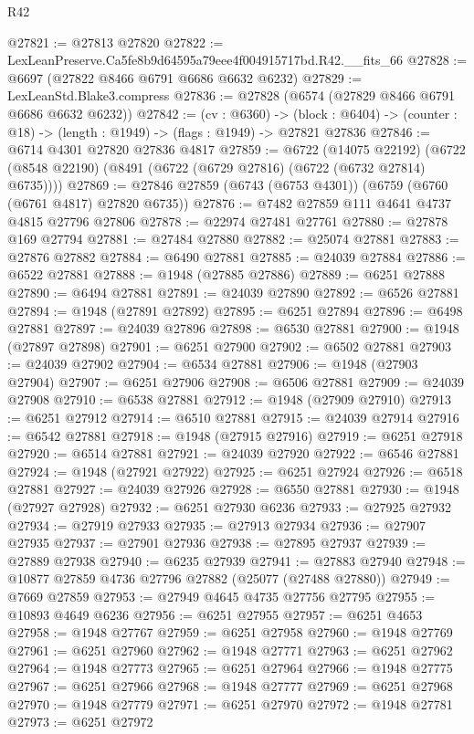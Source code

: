 \begin{lexlean}{R42}
\begin{coremodule}
{@27821 := @27813 @27820
@27822 := LexLeanPreserve.Ca5fe8b9d64595a79eee4f004915717bd.R42.__fits_66
@27828 := @6697 (@27822 @8466 @6791 @6686 @6632 @6232)
@27829 := LexLeanStd.Blake3.compress
@27836 := @27828 (@6574 (@27829 @8466 @6791 @6686 @6632 @6232))
@27842 := (cv : @6360) ->
  (block : @6404) -> (counter : @18) -> (length : @1949) -> (flags : @1949) -> @27821 @27836
@27846 := @6714 @4301 @27820 @27836 @4817
@27859 := @6722
    (@14075 @22192)
    (@6722 (@8548 @22190) (@8491 (@6722 (@6729 @27816) (@6722 (@6732 @27814) @6735))))
@27869 := @27846 @27859 (@6743 (@6753 @4301)) (@6759 (@6760 (@6761 @4817) @27820 @6735))
@27876 := @7482 @27859 @111 @4641 @4737 @4815 @27796 @27806
@27878 := @22974 @27481 @27761
@27880 := @27878 @169 @27794
@27881 := @27484 @27880
@27882 := @25074 @27881
@27883 := @27876 @27882
@27884 := @6490 @27881
@27885 := @24039 @27884
@27886 := @6522 @27881
@27888 := @1948 (@27885 @27886)
@27889 := @6251 @27888
@27890 := @6494 @27881
@27891 := @24039 @27890
@27892 := @6526 @27881
@27894 := @1948 (@27891 @27892)
@27895 := @6251 @27894
@27896 := @6498 @27881
@27897 := @24039 @27896
@27898 := @6530 @27881
@27900 := @1948 (@27897 @27898)
@27901 := @6251 @27900
@27902 := @6502 @27881
@27903 := @24039 @27902
@27904 := @6534 @27881
@27906 := @1948 (@27903 @27904)
@27907 := @6251 @27906
@27908 := @6506 @27881
@27909 := @24039 @27908
@27910 := @6538 @27881
@27912 := @1948 (@27909 @27910)
@27913 := @6251 @27912
@27914 := @6510 @27881
@27915 := @24039 @27914
@27916 := @6542 @27881
@27918 := @1948 (@27915 @27916)
@27919 := @6251 @27918
@27920 := @6514 @27881
@27921 := @24039 @27920
@27922 := @6546 @27881
@27924 := @1948 (@27921 @27922)
@27925 := @6251 @27924
@27926 := @6518 @27881
@27927 := @24039 @27926
@27928 := @6550 @27881
@27930 := @1948 (@27927 @27928)
@27932 := @6251 @27930 @6236
@27933 := @27925 @27932
@27934 := @27919 @27933
@27935 := @27913 @27934
@27936 := @27907 @27935
@27937 := @27901 @27936
@27938 := @27895 @27937
@27939 := @27889 @27938
@27940 := @6235 @27939
@27941 := @27883 @27940
@27948 := @10877 @27859 @4736 @27796 @27882 (@25077 (@27488 @27880))
@27949 := @7669 @27859
@27953 := @27949 @4645 @4735 @27756 @27795
@27955 := @10893 @4649 @6236
@27956 := @6251 @27955
@27957 := @6251 @4653
@27958 := @1948 @27767
@27959 := @6251 @27958
@27960 := @1948 @27769
@27961 := @6251 @27960
@27962 := @1948 @27771
@27963 := @6251 @27962
@27964 := @1948 @27773
@27965 := @6251 @27964
@27966 := @1948 @27775
@27967 := @6251 @27966
@27968 := @1948 @27777
@27969 := @6251 @27968
@27970 := @1948 @27779
@27971 := @6251 @27970
@27972 := @1948 @27781
@27973 := @6251 @27972
}
\end{coremodule}
\end{lexlean}
